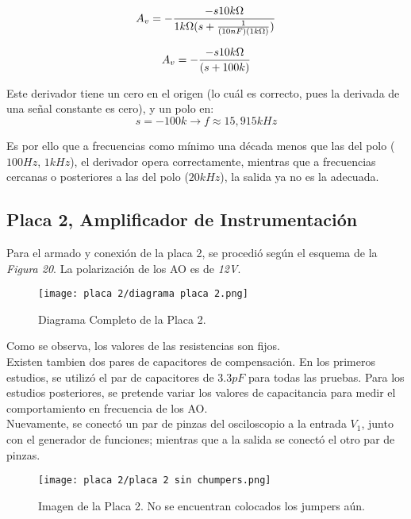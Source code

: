 \documentclass[letterpaper, 10 pt, conference]{ieeeconf}  %
\begin{document}
            \begin{equation}
            A_v =-\frac{-s10k\Omega}{1k\Omega(s+\frac{1}{(10nF)(1k\Omega)})}  \\
            \end{equation}

            \begin{equation}
            A_v =-\frac{-s10k\Omega}{(s+100k)}  \\
            \end{equation}

Este derivador tiene un cero en el origen (lo cuál es correcto, pues la derivada de una señal constante es cero), y un polo en: $$ s=-100k \rightarrow \textit{f} \approx 15,915 kHz $$

Es por ello que a frecuencias como mínimo una década menos que las del polo ($100Hz$, $1kHz$), el derivador opera correctamente, mientras que a frecuencias cercanas o posteriores a las del polo ($20kHz$), la salida ya no es la adecuada.


\subsection{Placa 2, Amplificador de Instrumentación}

Para el armado y conexión de la placa 2, se procedió según el esquema de la \textit{Figura 20}. La polarización de los AO es de \textit{12V}.

\begin{figure}[H]
  \centering
  \texttt{[image: placa 2/diagrama placa 2.png]}
  \caption{Diagrama Completo de la Placa 2.}
  \label{fig:diagramaplaca2}
\end{figure}

Como se observa, los valores de las resistencias son fijos.\\ Existen tambien dos pares de capacitores de compensación. En los primeros estudios, se utilizó el par de capacitores de $3.3pF$ para todas las pruebas. Para los estudios posteriores, se pretende variar los valores de capacitancia para medir el comportamiento en frecuencia de los AO.\\
Nuevamente, se conectó un par de pinzas del osciloscopio a la entrada $V_1$, junto con el generador de funciones; mientras que a la salida se conectó el otro par de pinzas.


\begin{figure}[H]
  \centering
  \texttt{[image: placa 2/placa 2 sin chumpers.png]}
  \caption{Imagen de la Placa 2. No se encuentran colocados los jumpers aún.}
  \label{fig:fotoplaca2}
\end{figure}
\end{document}
